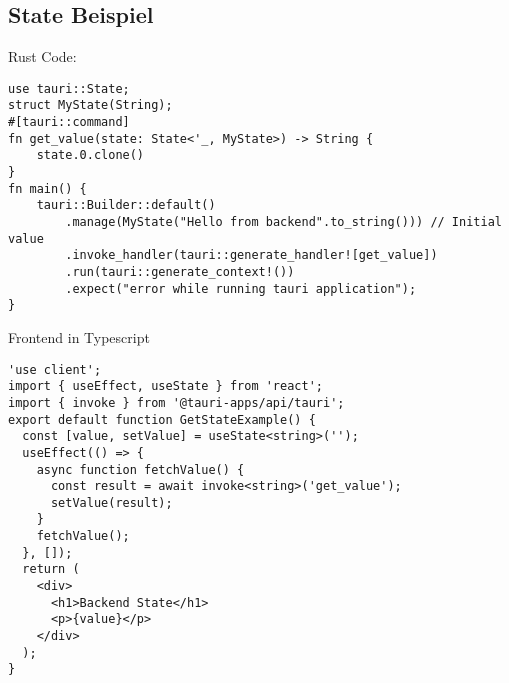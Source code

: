 \subsection{State Beispiel} 
\label{subsec:state-example}

Rust Code:

\begin{verbatim}
use tauri::State;
struct MyState(String);
#[tauri::command]
fn get_value(state: State<'_, MyState>) -> String {
    state.0.clone()
}
fn main() {
    tauri::Builder::default()
        .manage(MyState("Hello from backend".to_string())) // Initial value
        .invoke_handler(tauri::generate_handler![get_value])
        .run(tauri::generate_context!())
        .expect("error while running tauri application");
}
\end{verbatim}

Frontend in Typescript

\begin{verbatim}
'use client';
import { useEffect, useState } from 'react';
import { invoke } from '@tauri-apps/api/tauri';
export default function GetStateExample() {
  const [value, setValue] = useState<string>('');
  useEffect(() => {
    async function fetchValue() {
      const result = await invoke<string>('get_value');
      setValue(result);
    }
    fetchValue();
  }, []);
  return (
    <div>
      <h1>Backend State</h1>
      <p>{value}</p>
    </div>
  );
}
\end{verbatim}

